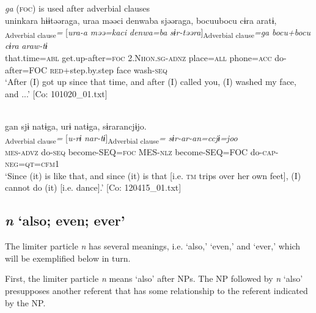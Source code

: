 \ea\label{ex:10.16}   \textit{ga} (\textsc{foc}) is used after adverbial clauses\\
  \ea  %
      \glll    uninkara  hɨɨtəəraga,  uraa  məəci {\textbar}denwa{\textbar}ba  sjəəraga,  bocuubocu  cɨra  aratɨ,\\
      [\textit{unin=kara}  \textit{hɨɨr-təəra}]\textsubscript{Adverbial clause}\textit{=}  [\textit{ura-a}  \textit{məə=kaci}    \textit{denwa=ba}  \textit{sɨr-təəra}]\textsubscript{Adverbial clause}\textit{=ga}  \textit{bocu+bocu}  \textit{cɨra}  \textit{araw-tɨ}\\
      that.time=\textsc{abl}  get.up-after=\textsc{foc}  2.N\textsc{hon}.\textsc{sg}-\textsc{adnz}  place=\textsc{all}   phone=\textsc{acc}  do-after=FOC  \textsc{red}+step.by.step  face  wash-\textsc{seq}\\
      \glt       ‘After (I) got up since that time, and after (I) called you, (I) washed my face, and ...’ [Co: 101020\_01.txt]

  \ex{}\\
      \glll    gan  sjɨ  natɨga,  urɨ  natɨga,  sɨrarancjɨjo.\\
      [\textit{ga-n}  \textit{sɨr-tɨ}  \textit{nar-tɨ}]\textsubscript{Adverbial clause}\textit{=}  [\textit{u-rɨ}   \textit{nar-tɨ}]\textsubscript{Adverbial clause}\textit{=}  \textit{sɨr-ar-an=ccjɨ=joo}\\
      \textsc{mes}-\textsc{advz}  do-\textsc{seq}  become-SEQ=\textsc{foc}  MES-\textsc{nlz}  become-SEQ=FOC  do-\textsc{cap}-\textsc{neg}=\textsc{qt}=\textsc{cfm}1\\
      \glt       ‘Since (it) is like that, and since (it) is that [i.e. \textsc{tm} trips over her own feet], (I) cannot do (it) [i.e. dance].’ [Co: 120415\_01.txt]
    \z
\z

\subsection{\textit{n} ‘also; even; ever’}\label{sec:10.1.3}

The limiter particle \textit{n} has several meanings, i.e. ‘also,’ ‘even,’ and ‘ever,’ which will be exemplified below in turn.

First, the limiter particle \textit{n} means ‘also’ after NPs. The NP followed by \textit{n} ‘also’ presupposes another referent that has some relationship to the referent indicated by the NP.

